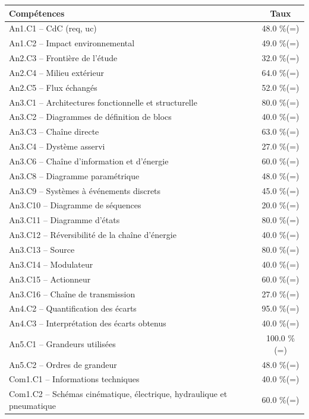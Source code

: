 \footnotesize 
\begin{center} 
\begin{tabular}{|p{.7\linewidth}|c|} 
\hline 
Compétences  & Taux \\ \hline \hline 
An1.C1 -- CdC (req, uc)&48.0 \%(=)\\ \hline 
An1.C2 -- Impact environnemental&49.0 \%(=)\\ \hline 
An2.C3 -- Frontière de l’étude&32.0 \%(=)\\ \hline 
An2.C4 -- Milieu extérieur&64.0 \%(=)\\ \hline 
An2.C5 -- Flux échangés&52.0 \%(=)\\ \hline 
An3.C1 -- Architectures fonctionnelle et structurelle&80.0 \%(=)\\ \hline 
An3.C2 -- Diagrammes de définition de blocs&40.0 \%(=)\\ \hline 
An3.C3 -- Chaîne directe&63.0 \%(=)\\ \hline 
An3.C4 -- Dystème asservi&27.0 \%(=)\\ \hline 
An3.C6 -- Chaîne d’information et d'énergie&60.0 \%(=)\\ \hline 
An3.C8 -- Diagramme paramétrique&48.0 \%(=)\\ \hline 
An3.C9 -- Systèmes à événements discrets&45.0 \%(=)\\ \hline 
An3.C10 -- Diagramme de séquences&20.0 \%(=)\\ \hline 
An3.C11 -- Diagramme d’états&80.0 \%(=)\\ \hline 
An3.C12 -- Réversibilité de la chaîne d’énergie&40.0 \%(=)\\ \hline 
An3.C13 -- Source&80.0 \%(=)\\ \hline 
An3.C14 -- Modulateur&40.0 \%(=)\\ \hline 
An3.C15 -- Actionneur&60.0 \%(=)\\ \hline 
An3.C16 -- Chaîne de transmission&27.0 \%(=)\\ \hline 
An4.C2 -- Quantification des écarts&95.0 \%(=)\\ \hline 
An4.C3 -- Interprétation des écarts obtenus&40.0 \%(=)\\ \hline 
An5.C1 -- Grandeurs utilisées &100.0 \%(=)\\ \hline 
An5.C2 -- Ordres de grandeur&48.0 \%(=)\\ \hline 
Com1.C1 -- Informations techniques&40.0 \%(=)\\ \hline 
Com1.C2 -- Schémas cinématique, électrique, hydraulique et pneumatique&60.0 \%(=)\\ \hline 

\end{tabular}
\end{center}
